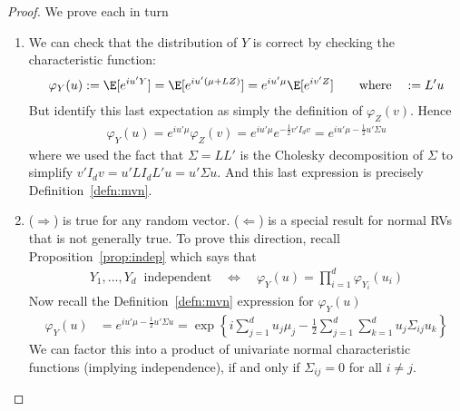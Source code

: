 \documentclass[12pt]{article}
\theoremstyle{plain}
\theoremstyle{definition}
\theoremstyle{remark}
\newcommand{\Cov}{\operatorname{Cov}}
\begin{document}
\begin{proof}
We prove each in turn
\begin{enumerate}[label=(\roman*)]
  \item
    We can check that the distribution of $Y$ is correct by checking the
    characteristic function:
    \begin{align*}
      \varphi_Y(u)
      := \E[e^{iu'Y}]
      = \E[e^{iu'(\mu+LZ)}]
      = e^{iu'\mu}\E[e^{iv'Z}]
      \qquad\text{where} \quad:=L'u
    \end{align*}
    But identify this last expectation as simply the definition of
    $\varphi_Z(v)$. Hence
    \begin{align*}
      \varphi_Y(u)
      = e^{iu'\mu}\varphi_Z(v)
      = e^{iu'\mu}e^{-\frac{1}{2}v'I_dv}
      = e^{iu'\mu-\frac{1}{2}u'\Sigma u}
    \end{align*}
    where we used the fact that $\Sigma=LL'$ is the Cholesky
    decomposition of $\Sigma$ to simplify $v'I_dv=u'LI_dL'u=u'\Sigma u$.
    And this last expression is precisely Definition~\ref{defn:mvn}.

  \item
    ($\Rightarrow$) is true for any random vector.
    ($\Leftarrow$) is a special result for normal RVs that is not
    generally true.
    To prove this direction, recall Proposition~\ref{prop:indep} which
    says that
    \begin{align*}
      Y_1,\ldots,Y_d \;\; \text{independent}
      \quad\iff\quad
      \varphi_Y(u) = \prod_{i=1}^d\varphi_{Y_i}(u_i)
    \end{align*}
    Now recall the Definition~\ref{defn:mvn} expression for
    $\varphi_Y(u)$
    \begin{align*}
      \varphi_Y(u)
      &= e^{iu'\mu-\frac{1}{2}u'\Sigma u}
      = \exp\left\{
          i\sum_{j=1}^du_j\mu_j
          -\frac{1}{2}\sum_{j=1}^d\sum_{k=1}^du_j\Sigma_{ij}u_k
        \right\}
    \end{align*}
    We can factor this into a product of univariate normal
    characteristic functions (implying independence), if and only if
    $\Sigma_{ij}=0$ for all $i\neq j$.


\end{enumerate}
\end{proof}
\end{document}
